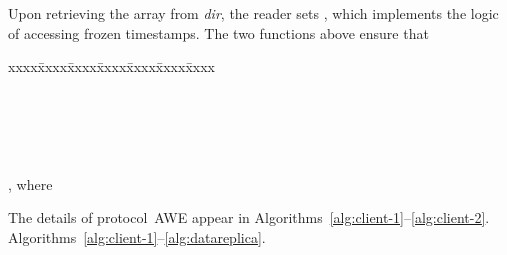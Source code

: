 \documentclass[oribibl]{llncs}
\theoremstyle{definition-boldhead}
\newcommand{\var}[1]{\textit{#1}}
\newcommand{\dir}{\var{dir}\xspace}
\newcommand{\NAME}{AWE\xspace}
\begin{document}
\newpage



\noindent
Upon retrieving the array  from \dir, the reader sets
,
which implements the logic of accessing frozen timestamps.
\if\submit\no
The two functions above ensure that
\begin{tabbing}\small
xxxx\=xxxx\=xxxx\=xxxx\=xxxx\=xxxx\=xxxx\kill
  \>  \\
  \> \>  \\
  \> \> \>  \\
  \> \> \>  \\
\\
  \>  \\
  \> \> ,
         where 
\end{tabbing}
\noindent
\fi
The details of protocol~\NAME appear in
\if\submit\yes
Algorithms~\ref{alg:client-1}--\ref{alg:client-2}.
\else
Algorithms~\ref{alg:client-1}--\ref{alg:datareplica}.
\fi
\end{document}
